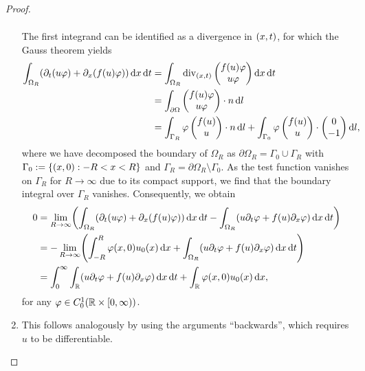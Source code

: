 \begin{proof}
\begin{enumerate}
\begin{align*}
		\end{align*}
		The first integrand can be identified as a divergence in \(\parentheses*{x, t}\), for which the Gauss theorem yields
		\begin{align*}
			\int_{\Omega_R}\parentheses*{\partial_t \parentheses*{u\varphi} + \partial_x \parentheses*{f\parentheses*{u}\varphi}}\d x\d t &= \int_{\Omega_R}\div_{\parentheses*{x, t}}\begin{pmatrix}
				f\parentheses*{u}\varphi\\
				u\varphi
			\end{pmatrix}\d x\d t\\
			&= \int_{\partial\Omega}\begin{pmatrix}
				f\parentheses*{u}\varphi\\
				u\varphi
			\end{pmatrix} \cdot n\d l\\
			&= \int_{\Gamma_R}\varphi\begin{pmatrix}
				f\parentheses*{u}\\
				u
			\end{pmatrix} \cdot n\d l + \int_{\Gamma_0}\varphi\begin{pmatrix}
				f\parentheses*{u}\\
				u
			\end{pmatrix} \cdot \begin{pmatrix}
				0\\
				-1
			\end{pmatrix}\d l,
		\end{align*}
		where we have decomposed the boundary of \(\Omega_R\) as \(\partial\Omega_R = \Gamma_0 \cup \Gamma_R\) with \(\Gamma_0 := \braces*{\parentheses*{x, 0} : -R < x < R}\) and \(\Gamma_R = \partial\Omega_R \setminus \Gamma_0\).
		As the test function vanishes on \(\Gamma_R\) for \(R \to \infty\) due to its compact support, we find that the boundary integral over \(\Gamma_R\) vanishes.
		Consequently, we obtain
		\begin{align*}
			0 &= \lim_{R \to \infty}\parentheses*{\int_{\Omega_R} \parentheses*{\partial_t \parentheses*{u\varphi} + \partial_x\parentheses*{f\parentheses*{u}\varphi}}\d x\d t - \int_{\Omega_R}\parentheses*{u\partial_t \varphi + f\parentheses*{u}\partial_x \varphi}\d x\d t}\\
			&= -\lim_{R \to \infty}\parentheses*{\int_{-R}^R \varphi\parentheses*{x, 0}u_0\parentheses*{x}\d x + \int_{\Omega_R}\parentheses*{u\partial_t \varphi + f\parentheses*{u}\partial_x \varphi}\d x\d t}\\
			&= \int_0^\infty \int_\R \parentheses*{u\partial_t \varphi + f\parentheses*{u}\partial_x \varphi}\d x\d t + \int_\R \varphi\parentheses*{x, 0}u_0\parentheses*{x}\d x,
		\end{align*}
		for any \(\varphi \in C_0^1\parentheses*{\R \times \left[0, \infty\right)}\).
		\item This follows analogously by using the arguments ``backwards'', which requires \(u\) to be differentiable.
	\end{enumerate}
\end{proof}
